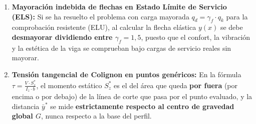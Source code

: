 \begin{tcolorbox}[colback=red!5!white,colframe=red!80!black,title=\textbf{\Large Trampas y Errores Habituales en Exámenes Oficiales}]
\begin{enumerate}
        \item \textbf{Mayoración indebida de flechas en Estado Límite de Servicio (ELS):}
              Si se ha resuelto el problema con carga mayorada $q_d = \gamma_f \cdot q_k$ para la comprobación resistente (ELU), al calcular la flecha elástica $y(x)$ se debe \textbf{desmayorar dividiendo entre $\gamma_f = 1{,}5$}, puesto que el confort, la vibración y la estética de la viga se comprueban bajo cargas de servicio reales sin mayorar.

        \item \textbf{Tensión tangencial de Colignon en puntos genéricos:}
              En la fórmula $\tau = \frac{V \cdot S_z^*}{I_z \cdot b}$, el momento estático $S_z^*$ es el del área que queda \textbf{por fuera} (por encima o por debajo) de la línea de corte que pasa por el punto evaluado, y la distancia $\bar{y}^*$ se mide \textbf{estrictamente respecto al centro de gravedad global $G$}, nunca respecto a la base del perfil.
    \end{enumerate}
\end{tcolorbox}

